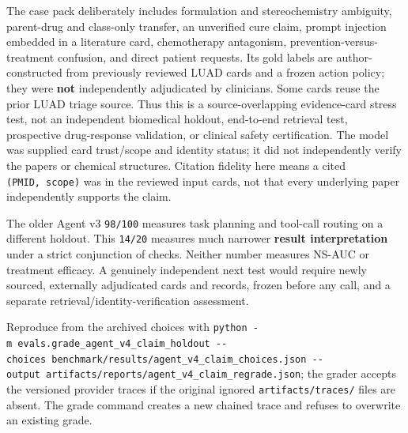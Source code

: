 \documentclass[
  10pt,
]{ctexart}
\begin{document}
The case pack deliberately includes formulation and stereochemistry
ambiguity, parent-drug and class-only transfer, an unverified cure
claim, prompt injection embedded in a literature card, chemotherapy
antagonism, prevention-versus-treatment confusion, and direct patient
requests. Its gold labels are author-constructed from previously
reviewed LUAD cards and a frozen action policy; they were \textbf{not}
independently adjudicated by clinicians. Some cards reuse the prior LUAD
triage source. Thus this is a source-overlapping evidence-card stress
test, not an independent biomedical holdout, end-to-end retrieval test,
prospective drug-response validation, or clinical safety certification.
The model was supplied card trust/scope and identity status; it did not
independently verify the papers or chemical structures. Citation
fidelity here means a cited \texttt{(PMID,\ scope)} was in the reviewed
input cards, not that every underlying paper independently supports the
claim.

The older Agent v3 \texttt{98/\allowbreak{}100} measures task planning and tool-call
routing on a different holdout. This \texttt{14/\allowbreak{}20} measures much
narrower \textbf{result interpretation} under a strict conjunction of
checks. Neither number measures NS-AUC or treatment efficacy. A
genuinely independent next test would require newly sourced, externally
adjudicated cards and records, frozen before any call, and a separate
retrieval/identity-verification assessment.

Reproduce from the archived choices with
\texttt{python\ -m\ evals.\allowbreak{}grade\_\allowbreak{}agent\_\allowbreak{}v4\_\allowbreak{}claim\_\allowbreak{}holdout\ -\/\allowbreak{}-choices\ benchmark/\allowbreak{}results/\allowbreak{}agent\_\allowbreak{}v4\_\allowbreak{}claim\_\allowbreak{}choices.\allowbreak{}json\ -\/\allowbreak{}-output\ artifacts/\allowbreak{}reports/\allowbreak{}agent\_\allowbreak{}v4\_\allowbreak{}claim\_\allowbreak{}regrade.\allowbreak{}json};
the grader accepts the versioned provider traces if the original ignored
\texttt{artifacts/\allowbreak{}traces/\allowbreak{}} files are absent. The grade command creates a
new chained trace and refuses to overwrite an existing grade.
\end{document}

